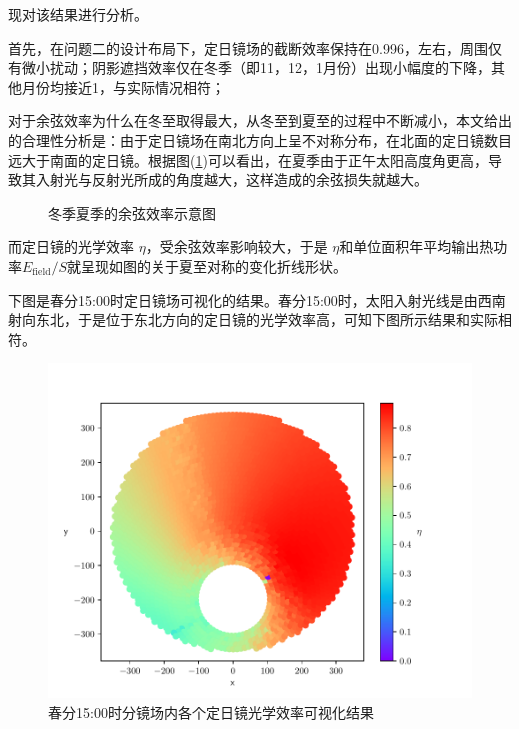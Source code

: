 现对该结果进行分析。

首先，在问题二的设计布局下，定日镜场的截断效率保持在0.996，左右，周围仅有微小扰动；阴影遮挡效率仅在冬季（即11，12，1月份）出现小幅度的下降，其他月份均接近1，与实际情况相符；

对于余弦效率为什么在冬至取得最大，从冬至到夏至的过程中不断减小，本文给出的合理性分析是：由于定日镜场在南北方向上呈不对称分布，在北面的定日镜数目远大于南面的定日镜。根据图(\ref{summer_winter})可以看出，在夏季由于正午太阳高度角更高，导致其入射光与反射光所成的角度越大，这样造成的余弦损失就越大。
\begin{figure}[H]
\centering

\caption{\kaishu 冬季夏季的余弦效率示意图}\label{summer_winter}
\end{figure}

而定日镜的光学效率 \(\eta\)，受余弦效率影响较大，于是
\(\eta\)和单位面积年平均输出热功率\(E_{\mathrm{field}}/S\)就呈现如图的关于夏至对称的变化折线形状。

下图是春分15:00时定日镜场可视化的结果。春分15:00时，太阳入射光线是由西南射向东北，于是位于东北方向的定日镜的光学效率高，可知下图所示结果和实际相符。
\begin{figure}[H]
\centering
\includegraphics[scale = 0.7]{rainbow2.pdf}
\caption{\kaishu 春分{\rm 15:00}时分镜场内各个定日镜光学效率可视化结果}\label{rainbow2}
\end{figure}
